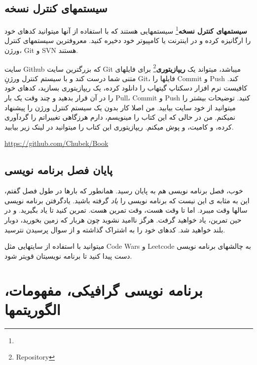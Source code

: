 \documentclass[14pt,a4paper]{memoir}
\begin{document}
	
	
	\section{سیستمهای کنترل نسخه}\label{revcontrol}
	 
	 \textbf{سیستمهای کنترل نسخه}\footnote{} سیستمهایی هستند که با استفاده از آنها میتوانید کدهای خود را ارگانیزه کرده و در اینترنت یا کامپیوتر خود دخیره کنید. معروفترین سیستمهای کنترل ورژن، Git و SVN هستند.
	 
	 سایت Github که بزرگترین سایت Git میباشد، میتواند یک \textbf{ریپازیتوری}\footnote{Repository} برای فایلهای متنی شما درست کند و با سیستم کنترل ورژنِ Git، فایلها را Commit و Push کند. کافیست نرم افزار دسکتاپ گیتهاب را دانلود کرده، یک ریپازیتوری بسازید، کدهای خود را در آن قرار بدهید و چند وقت یک بار Pull، Commit و Push کنید. توضیحات بیشتر را میتوانید از خود سایت بیابید. من اصلا کار بدون یک سیستم کنترل ورژن را پیشنهاد نمیکنم. من در حالی که این کتاب را مینویسم، دارم هرزگاهی تغییراتم را گردآوری کرده، و کامیت، و پوش میکنم. ریپازیتوری این کتاب را میتوانید در لینک زیر بیابید.
	 
	 \url{https://github.com/Chubek/Book}
	 
	 \section{پایان فصل برنامه نویسی}
	 خوب، فصل برنامه نویسی هم به پایان رسید. همانطور که بارها در طول فصل گفتم، این به مثابه ی این نیست که برنامه نویسی را \textit{یاد} گرفته باشید. یادگرفتن برنامه نویسی سالها وقت میبرد. اما تا وقت هست، وقت تمرین هست. تمرین کنید تا یاد بگیرید. و در حین تمرین، یاد خواهید گرفت. هرگز ناامید نشوید چون هربار که زمین بخورید، دوبار بلند خواهید شد. کدهای خود را به اشتراک گذاشته و از سوال پرسیدن نترسید. 
	 
	میتوانید با استفاده از سایتهایی مثل Code Wars و Leetcode به چالشهای برنامه نویسی دست پیدا کنید تا برنامه نویسیتان قویتر شود.
	 
	 
	 
	 \chapter{برنامه نویسی گرافیکی، مفهومات، الگوریتمها}\label{graphicsalg}
	 
	 
	 
	 
	 
	 
	 
	 
	 
	 
	 
	 
	 
	 
\end{document}

